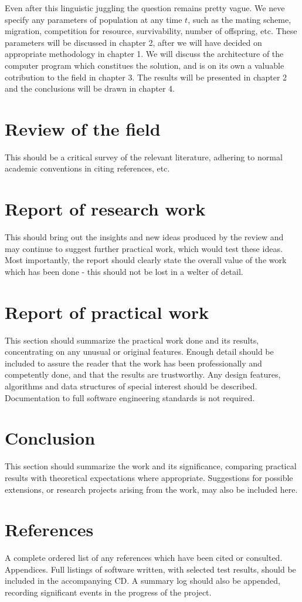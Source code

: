\documentclass{l4proj}
\begin{document}
Even after this linguistic juggling the question remains pretty vague. We neve specify any parameters of population at any time $t$, such as the mating scheme, migration, competition for resource, survivability, number of offspring, etc. These parameters will be discussed in chapter 2, after we will have decided on appropriate methodology in chapter 1. We will discuss the architecture of the computer program which constitues the solution, and is on its own a valuable cotribution to the field in chapter 3. The results will be presented in chapter 2 and the conclusions will be drawn in chapter 4.

\chapter{Review of the field}
This should be a critical survey of the relevant literature, adhering to normal academic conventions in citing references, etc.

\chapter{Report of research work}
This should bring out the insights and new ideas produced by the review and may continue to suggest further practical work, which would test these ideas. Most importantly, the report should clearly state the overall value of the work which has been done - this should not be lost in a welter of detail.

\chapter{Report of practical work}
This section should summarize the practical work done and its results, concentrating on any unusual or original features. Enough detail should be included to assure the reader that the work has been professionally and competently done, and that the results are trustworthy. Any design features, algorithms and data structures of special interest should be described. Documentation to full software engineering standards is not required.

\chapter{Conclusion}
This section should summarize the work and its significance, comparing practical results with theoretical expectations where appropriate. Suggestions for possible extensions, or research projects arising from the work, may also be included here.

\chapter{References}
 A complete ordered list of any references which have been cited or consulted.
Appendices. Full listings of software written, with selected test results, should be included in the accompanying CD. A summary log should also be appended, recording significant events in the progress of the project.



\end{document}
